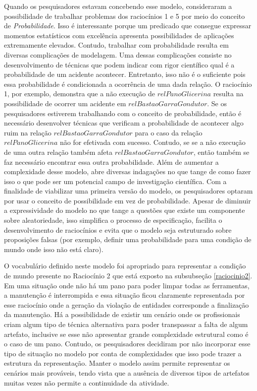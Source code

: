 Quando os pesquisadores estavam concebendo esse modelo, consideraram a possibilidade de trabalhar problemas dos raciocínios 1 e 5 por meio do conceito de \textit{Probabilidade}. Isso é interessante porque um predicado que consegue expressar momentos estatísticos com excelência apresenta possibilidades de aplicações extremamente elevados. Contudo, trabalhar com probabilidade resulta em diversas complicações de modelagem. Uma dessas complicações consiste no desenvolvimento de técnicas que podem indicar com rigor científico qual é a probabilidade de um acidente acontecer. Entretanto, isso não é o suficiente pois essa probabilidade é condicionada a ocorrência de uma dada relação. O raciocínio 1, por exemplo, demonstra que a não execução de $relPanoGlicerina$ resulta na possibilidade de ocorrer um acidente em $relBastaoGarraGondutor$. Se os pesquisadores estiverem trabalhando com o conceito de probabilidade, então é necessário desenvolver técnicas que verificam a probabilidade de acontecer algo ruim na relação $relBastaoGarraGondutor$ para o caso da relação $relPanoGlicerina$ não for efetivada com sucesso. Contudo, se se a não execução de uma outra relação também afeta $relBastaoGarraGondutor$, então também se faz necessário encontrar essa outra probabilidade. Além de aumentar a complexidade desse modelo, abre diversas indagações no que tange de como fazer isso o que pode ser um potencial campo de investigação científica. Com a finalidade de viabilizar uma primeira versão do modelo, os pesquisadores optaram por usar o conceito de possibilidade em vez de probabilidade. Apesar de diminuir a expressividade do modelo no que tange a questões que existe um componente sobre aleatoriedade, isso simplifica o processo de especificação, facilita o desenvolvimento de raciocínios e evita que o modelo seja estruturado sobre proposições falsas (por exemplo, definir uma probabilidade para uma condição 
de mundo onde isso não está claro). 

O vocabulário definido neste modelo foi apropriado para representar a condição de mundo presente no Raciocínio 2 que está exposto na subsubseção \ref{raciocinio2}. Em uma situação onde não há um pano para poder limpar todas as ferramentas, a manutenção é interrompida e essa situação ficou claramente representada por esse raciocínio onde a geração da violação de entidades corresponde a finalização da manutenção. Há a possibilidade de existir um cenário onde os profissionais criam algum tipo de técnica alternativa para poder transpassar a falta de algum artefato, inclusive se esse não apresentar grande complexidade estrutural como é o caso de um pano. Contudo, os pesquisadores decidiram por não incorporar esse tipo de situação no modelo por conta de complexidades que isso pode trazer a estrutura da representação. Manter o modelo assim permite representar os cenários mais prováveis, tendo vista que a ausência de diversos tipos de artefatos muitas vezes não permite a continuidade da atividade.    

